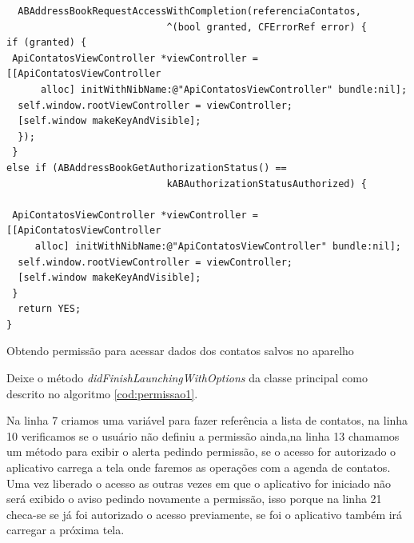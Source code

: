 \documentclass[a4paper,12pt,brazil,doubleside]{book}
\begin{document}
\begin{singlespace}
\begin{listing}[H]
\begin{verbatim}
  ABAddressBookRequestAccessWithCompletion(referenciaContatos, 
  							^(bool granted, CFErrorRef error) {
if (granted) {
 ApiContatosViewController *viewController = [[ApiContatosViewController 
      alloc] initWithNibName:@"ApiContatosViewController" bundle:nil];
  self.window.rootViewController = viewController;
  [self.window makeKeyAndVisible]; 
  });
 }
else if (ABAddressBookGetAuthorizationStatus() == 
   							kABAuthorizationStatusAuthorized) {
							
 ApiContatosViewController *viewController = [[ApiContatosViewController 
     alloc] initWithNibName:@"ApiContatosViewController" bundle:nil];
  self.window.rootViewController = viewController;
  [self.window makeKeyAndVisible];
 }
  return YES;
}
\end{verbatim}
\caption{Obtendo permissão para acessar dados dos contatos salvos no aparelho}
\label{cod:permissao1}
\end{listing}

Deixe o método \emph{didFinishLaunchingWithOptions} da classe principal como descrito no algoritmo \ref{cod:permissao1}.

Na linha 7 criamos uma variável para fazer referência a lista de contatos, na linha 10 verificamos se o usuário não definiu a permissão ainda,na linha 13 chamamos um método para exibir o alerta pedindo permissão, se o acesso for autorizado o aplicativo carrega a tela onde faremos as operações com a agenda de contatos. Uma vez liberado o acesso as outras vezes em que o aplicativo for iniciado não será exibido o aviso pedindo novamente a permissão, isso porque na linha 21 checa-se se já foi autorizado o acesso previamente, se foi o aplicativo também irá carregar a próxima tela.


\end{singlespace}
\end{document}
